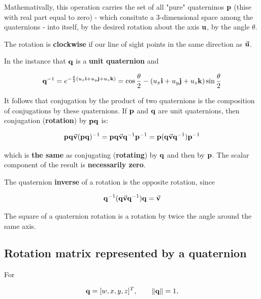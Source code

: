 Mathemativally, this operation carries the set of all "pure" quaterninos
$ \mathbf{p} $ (thise with real part equal to zero) - which consitute a 3-dimensional
space among the quaternions - into itself, by the desired rotation about the axis
$ \mathbf{u} $, by the angle $ \theta $.

The rotation is \textbf{clockwise} if our line of sight points in the same direction
as $ \vec{\mathbf{u}} $.

In the instance that $ \mathbf{q} $ is a \textbf{unit quaternion} and

\begin{equation}
    \mathbf{q}^{-1} = e^{-\frac{\theta}{2} ( u_x \mathbf{i} + u_y \mathbf{j} + u_z \mathbf{k} )}
    = \cos \frac{\theta}{2} - ( u_x \mathbf{i} + u_y \mathbf{j} + u_z \mathbf{k} ) \sin \frac{\theta}{2}
\end{equation}

It follows that conjugation by the product of two quaternions is the composition of
conjugations by these quaternions. If $ \mathbf{p} $ and $ \mathbf{q} $ are unit quaternions,
then conjugation (\textbf{rotation}) by $ \mathbf{p} \mathbf{q} $ is:

\begin{equation}
    \mathbf{p} \mathbf{q} \vec{\mathbf{v}} ( \mathbf{p} \mathbf{q} )^{-1}
    = \mathbf{p} \mathbf{q} \vec{\mathbf{v}} \mathbf{q}^{-1} \mathbf{p}^{-1}
    = \mathbf{p} ( \mathbf{q} \vec{\mathbf{v}} \mathbf{q}^{-1} ) \mathbf{p}^{-1}
\end{equation}

which is \textbf{the same} as conjugating (\textbf{rotating}) by $ \mathbf{q} $ and
then by $ \mathbf{p} $. The scalar component of the result is \textbf{necessarily zero}.

The quaternion \textbf{inverse} of a rotation is the opposite rotation, since

\begin{equation}
    \mathbf{q}^{-1} (\mathbf{q} \vec{\mathbf{v}} \mathbf{q}^{-1} ) \mathbf{q} = \vec{\mathbf{v}}
\end{equation}

The square of a quaternion rotation is a rotation by twice the angle around the same axis.




\subsection{Rotation matrix represented by a quaternion}

For

\begin{equation}
    \mathbf{q}=[w,x,y,z]^T,
    \qquad \| {\mathbf{q}} \|=1,
\end{equation}

